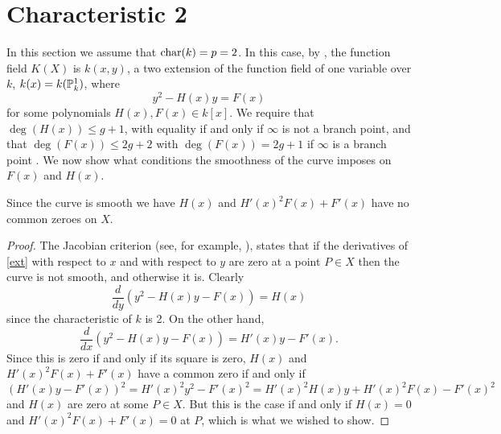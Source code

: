 \section{Characteristic 2}

In this section we assume that $\operatorname{char}(k) = p  =2$.   
In this case, by \cite[Prop. 7.4.24]{liu}, the function field $K(X)$ is $k(x,y)$, a two extension of the function field of one variable over $k$, $k(x) = k({\mathbb P}_k^1)$, where
    \begin{equation}\label{ext}
    y^2 - H(x)y = F(x)
    \end{equation}
for some polynomials $H(x), F(x)\in k[x]$.
We require that $\deg(H(x)) \leq g+1$, with equality if and only if $\infty$ is not a branch point, and that $\deg(F(x)) \leq 2g+2$ with $\deg(F(x)) = 2g+1$ if $\infty$ is a branch point  \cite[Prop.\ 7.4.24]{liu}.
We now show what conditions the smoothness of the curve imposes on $F(x)$ and $H(x)$.



\begin{lem}\label{smoothness}
    Since the curve is smooth we have $H(x)$ and $H'(x)^2 F(x) + F'(x)$ have no common zeroes on $X$.
    \end{lem}
    \begin{proof}
    The Jacobian criterion (see, for example, \cite[Thm. 4.2.19]{liu}), states that if the derivatives of \eqref{ext} with respect to $x$ and with respect to $y$ are zero at a point $P\in X$ then the curve is not smooth, and otherwise it is.
    Clearly
        \[
        \frac{d}{dy} (y^2 -H(x)y -F(x)) = H(x)
        \]
    since the characteristic of $k$ is 2.
    On the other hand,
        \[
        \frac{d}{dx} (y^2 - H(x)y -F(x)) = H'(x)y - F'(x).
        \]
    Since this is zero if and only if its square is zero, $H(x)$ and $H'(x)^2 F(x) + F'(x)$ have a common zero if and only if
        \[
        (H'(x)y-F'(x))^2 = H'(x)^2y^2 -F'(x)^2 = H'(x)^2H(x)y + H'(x)^2F(x) - F'(x)^2
        \]
    and $H(x)$ are zero at some $P\in X$.
    But this is the case if and only if $H(x) = 0$ and $H'(x)^2F(x) + F'(x) = 0$ at $P$, which is what we wished to show.
    \end{proof}

